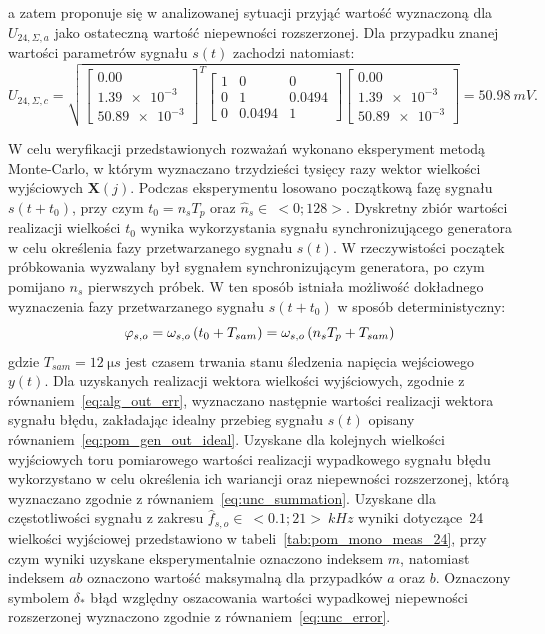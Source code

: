 a zatem proponuje się w analizowanej sytuacji przyjąć wartość wyznaczoną dla $U_{24,\Sigma,a}$ jako ostateczną wartość niepewności rozszerzonej. Dla przypadku znanej wartości parametrów sygnału $s(t)$ zachodzi natomiast:
\begin{equation}
U_{24,\Sigma,c} = \sqrt{
\begin{bmatrix}
\num{0.00} \\ \num{1.39e-3} \\ \num{50.89e-3}
\end{bmatrix}^{T}
\begin{bmatrix}
\num{1} & \num{0} & \num{0} \\
\num{0} & \num{1} & \num{0.0494} \\
\num{0} & \num{0.0494} & \num{1}
\end{bmatrix}
\begin{bmatrix}
\num{0.00} \\ \num{1.39e-3} \\ \num{50.89e-3}
\end{bmatrix}} = \qty{50.98}{mV}
\label{eq:pom_mono_all_unc_c}.
\end{equation}

W celu weryfikacji przedstawionych rozważań wykonano eksperyment metodą Monte-Carlo, w którym wyznaczano trzydzieści tysięcy razy wektor wielkości wyjściowych $\mathbf{X}(j)$. Podczas eksperymentu losowano początkową fazę sygnału $s(t+t_{0})$, przy czym $t_{0} = n_{s} T_{p}$ oraz $\hat{n}_{s} \in~<0;128>$. Dyskretny zbiór wartości realizacji wielkości $t_{0}$ wynika wykorzystania sygnału synchronizującego generatora w celu określenia fazy przetwarzanego sygnału $s(t)$. W rzeczywistości początek próbkowania wyzwalany był sygnałem synchronizującym generatora, po czym pomijano $n_{s}$ pierwszych próbek. W ten sposób istniała możliwość dokładnego wyznaczenia fazy przetwarzanego sygnału $s(t+t_{0})$ w sposób deterministyczny:
\begin{equation}
\varphi_{s,o} = \omega_{s,o} \left(t_{0} + T_{sam}\right) = \omega_{s,o} \left(n_{s} T_{p} + T_{sam}\right) \label{eq:pom_mono_delay}
\end{equation}
gdzie $T_{sam} = \qty{12}{\micro s}$ jest czasem trwania stanu śledzenia napięcia wejściowego $y(t)$. Dla uzyskanych realizacji wektora wielkości wyjściowych, zgodnie z równaniem~\eqref{eq:alg_out_err}, wyznaczano następnie wartości realizacji wektora sygnału błędu, zakładając idealny przebieg sygnału $s(t)$ opisany równaniem~\eqref{eq:pom_gen_out_ideal}. Uzyskane dla kolejnych wielkości wyjściowych toru pomiarowego wartości realizacji wypadkowego sygnału błędu wykorzystano w celu określenia ich wariancji oraz niepewności rozszerzonej, którą wyznaczano zgodnie z równaniem~\eqref{eq:unc_summation}. Uzyskane dla częstotliwości sygnału z zakresu $\hat{f}_{s,o} \in~<\num{0.1};\num{21}>~\unit{kHz}$ wyniki dotyczące~\qty{24}{\numTej} wielkości wyjściowej przedstawiono w tabeli~\ref{tab:pom_mono_meas_24}, przy czym wyniki uzyskane eksperymentalnie oznaczono indeksem $m$, natomiast indeksem $ab$ oznaczono wartość maksymalną dla przypadków $a$ oraz $b$. Oznaczony symbolem $\delta_{*}$ błąd względny oszacowania wartości wypadkowej niepewności rozszerzonej wyznaczono zgodnie z równaniem~\eqref{eq:unc_error}.

